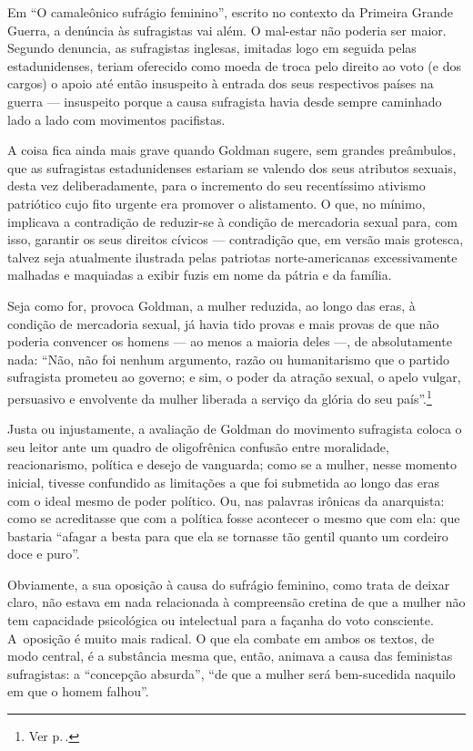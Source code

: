 Em ``O camaleônico sufrágio feminino'', escrito no contexto da Primeira
Grande Guerra, a denúncia às sufragistas vai além. O mal-estar não
poderia ser maior. Segundo denuncia, as sufragistas inglesas, imitadas
logo em seguida pelas estadunidenses, teriam oferecido como moeda de
troca pelo direito ao voto (e dos cargos) o apoio até então insuspeito à
entrada dos seus respectivos países na guerra --- insuspeito porque
a causa sufragista havia desde sempre caminhado lado a lado com movimentos
pacifistas.

A coisa fica ainda mais grave quando
Goldman sugere, sem grandes preâmbulos,
que as sufragistas estadunidenses estariam se valendo dos seus atributos sexuais, desta vez
deliberadamente, para o incremento do seu recentíssimo ativismo
patriótico cujo fito urgente era promover o alistamento. O
que, no mínimo, implicava a contradição de reduzir-se à condição de
mercadoria sexual para, com isso, garantir os seus direitos cívicos ---
contradição que, em versão mais grotesca, talvez seja atualmente
ilustrada pelas patriotas norte-americanas excessivamente malhadas e
maquiadas a exibir fuzis em nome da pátria e da família.

Seja
como for, provoca Goldman, a mulher reduzida, ao
longo das eras, à condição de mercadoria sexual, já havia tido provas e
mais provas de que não poderia convencer os homens --- ao menos a maioria
deles ---, de absolutamente nada: ``Não, não foi nenhum argumento, razão ou humanitarismo que o partido sufragista prometeu ao governo; e sim, o poder da atração
sexual, o apelo vulgar, persuasivo e envolvente da mulher liberada a
serviço da glória do seu país''.\footnote{Ver p.\,\pageref{argumento}.}

Justa ou injustamente, a avaliação de Goldman do movimento sufragista
coloca o seu leitor ante um quadro de oligofrênica confusão entre
moralidade, reacionarismo, política e desejo de vanguarda; como se a
mulher, nesse momento inicial, tivesse confundido as limitações a que
foi submetida ao longo das eras com o ideal mesmo de poder político. Ou,
nas palavras irônicas da anarquista: como se acreditasse que com a
política fosse acontecer o mesmo que com ela: que bastaria ``afagar a
besta para que ela se tornasse tão gentil quanto um cordeiro doce e
puro''.

Obviamente, a sua oposição à causa do sufrágio feminino, como
trata de deixar claro, não estava em nada relacionada à compreensão
cretina de que a mulher não tem capacidade psicológica ou intelectual
para a façanha do voto consciente. A~oposição é muito mais
radical. O que ela combate em ambos os textos, de modo central, é a
substância mesma que, então, animava a causa das feministas sufragistas:
a ``concepção absurda'', ``de que a mulher será bem-sucedida naquilo em
que o homem falhou''.

